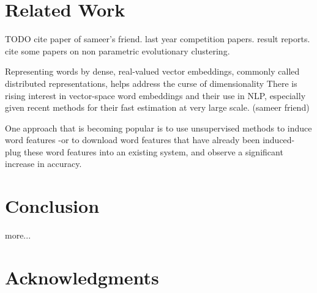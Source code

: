 \documentclass{article}
\begin{document}
\section{Related Work}
\label{related}

TODO 
cite paper of sameer's friend.
last year competition papers. result reports.
cite some papers on non parametric evolutionary clustering.

Representing words by dense, real-valued vector embeddings, commonly called distributed representations, helps address the curse of dimensionality
There is rising interest in vector-space word embeddings and their use in NLP, especially given recent methods for their fast estimation at very large scale. (sameer friend)

One approach that is becoming popular is to use unsupervised methods to induce word features -or to download word features that have already been induced- plug these word features into an existing system, and observe a significant increase in accuracy.

\section{Conclusion}
\label{conclusion}

more...

\section*{Acknowledgments} 
 


\end{document}
